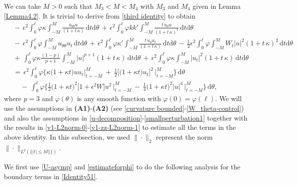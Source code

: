 \documentclass[10pt, reqno]{amsart}
\numberwithin{equation}{section}
\theoremstyle{definition}
\begin{document}
{{We can take $M>0$ such that $M_3<M<M_4$ with $M_3$ and $M_4$ given in Lemma \ref{Lemma4.2}.
 It is trivial to derive from \eqref{third identity} to obtain
\begin{align}
 &\,-\,\epsilon^2\int_0^\ell \varphi \kappa\int_{-M}^{M} \frac{u_{\theta\theta} u}{(1+t\,\kappa)}\,{\mathrm d}t{\mathrm d}\theta
 \,+\, \epsilon^2 \int_0^\ell \varphi kk'\int_{-M}^{M} \frac{t\,u_\theta u}{(1+t\,\kappa)^2}\,{\mathrm d}t{\mathrm d}\theta
\nonumber\\[2mm]
 &
 \,-\,\epsilon^2\int_0^\ell \varphi \int_{-M}^{M} u_{\theta\theta} u_t\,{\mathrm d}t{\mathrm d}\theta
 \,+\, \epsilon^2 \int_0^\ell \varphi \kappa'\int_{-M}^{M} \frac{t\,u_\theta u_t}{(1+t\,\kappa)} \,{\mathrm d}t{\mathrm d}\theta
 \,-\,
 \frac{1}{2}\epsilon^2\int_0^\ell \varphi \int_{-M}^{M} W_t|u|^2
 (1+t\,\kappa)^2\,{\mathrm d}t{\mathrm d}\theta
\nonumber\\[2mm]
 &\,+\,\int_0^\ell \varphi \kappa\frac{(1-p)}{p+1}\int_{-M}^{M} |u|^{p+1} (1+t\,\kappa)\,{\mathrm d}t{\mathrm d}\theta
 \,+\,
 \epsilon^2\int_0^\ell \varphi \kappa\int_{-M}^{M} |u_t|^2 (1+t\,\kappa)\,{\mathrm d}t{\mathrm d}\theta
\nonumber\\[2mm]
 &\,=\,
 \epsilon^2 \int_0^\ell\varphi\Bigg\{\kappa\big(1+\kappa t\big) u u_t \Big|_{t=-{M}}^{M}
 \ +\
 \frac{1}{2} \Big[ \big(1+\kappa t\big) u_t \Big]^2\, \Big|_{t=-{M}}^{M}\Bigg\} \,{\mathrm d}\theta
\nonumber\\[2mm]
 &\quad
 \ -\
 \int_0^\ell\varphi\Bigg\{\frac{1}{2}\big(1+\kappa t\big)^2 \big[1+ \epsilon^2 W\big] u^2\, \Big|_{t=-{M}}^{M}
 \ -\
 \frac 1 4 \big(1+\kappa t\big)^2 |u|^4\, \Big|_{t=-{M}}^{M}\Bigg\} \,{\mathrm d}\theta,
 \label{Identity51}
\end{align}
where $p=3$ and $\varphi(\theta)$ is any smooth function with $\varphi(0)=\varphi(\ell)$.
We will use the assumptions in {\bf{(A1)}}-{\bf{(A2)}} (see \eqref{curvature bounded}-\eqref{W_theta-control})
 and also the assumptions in \eqref{u-decomposition}-\eqref{smallperturbation1}
 together with the results in \eqref{v1-L2norm-0}-\eqref{v1-zz-L2norm-1} to estimate all the terms in the above identity.
In this subsection, we used $\|\cdot\|_2$ represent the norm $\|\cdot\|_{L^2(\{|t|\leq M\}\})}$.

\medskip
\noindent {\bf{Part 1.}}
 We first use \eqref{U-asymp} and \eqref{estimateforphi} to do the following analysis for the boundary terms in \eqref{Identity51}.

}}
\end{document}
